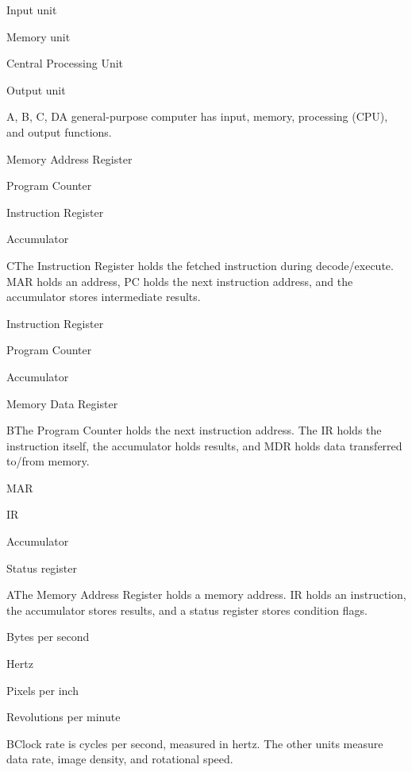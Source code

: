 \begin{enumerate}[label=\textbf{Q\arabic*.}, leftmargin=*]
  {\item Input unit
   \item Memory unit
   \item Central Processing Unit
   \item Output unit}
  {A, B, C, D}{A general-purpose computer has input, memory, processing (CPU), and output functions.}
\fi
\ifnum{}
  {\item Memory Address Register
   \item Program Counter
   \item Instruction Register
   \item Accumulator}
  {C}{The Instruction Register holds the fetched instruction during decode/execute. MAR holds an address, PC holds the next instruction address, and the accumulator stores intermediate results.}
  {\item Instruction Register
   \item Program Counter
   \item Accumulator
   \item Memory Data Register}
  {B}{The Program Counter holds the next instruction address. The IR holds the instruction itself, the accumulator holds results, and MDR holds data transferred to/from memory.}
  {\item MAR
   \item IR
   \item Accumulator
   \item Status register}
  {A}{The Memory Address Register holds a memory address. IR holds an instruction, the accumulator stores results, and a status register stores condition flags.}
  {\item Bytes per second
   \item Hertz
   \item Pixels per inch
   \item Revolutions per minute}
  {B}{Clock rate is cycles per second, measured in hertz. The other units measure data rate, image density, and rotational speed.}

\end{enumerate}
